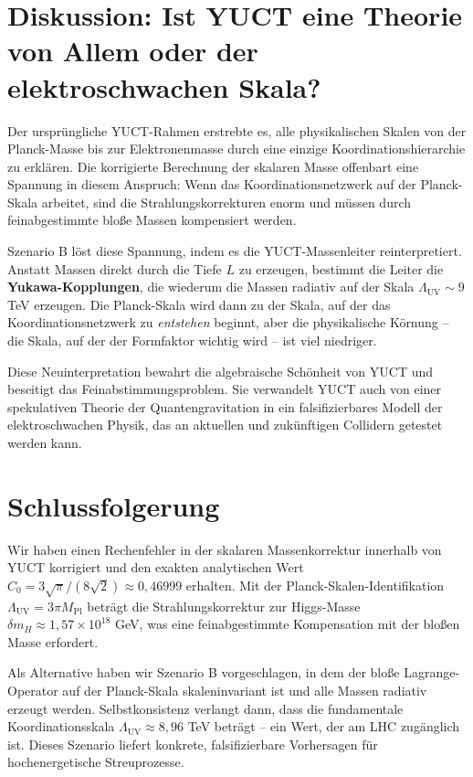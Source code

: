 \documentclass[11pt,a4paper]{article}
\newcommand{\Mpl}{M_{\mathrm{Pl}}}
\newcommand{\LUV}{\Lambda_{\mathrm{UV}}}
\theoremstyle{remark}
\begin{document}
	\section{Diskussion: Ist YUCT eine Theorie von Allem oder der elektroschwachen Skala?}
	\label{sec:discussion}
	
	Der ursprüngliche YUCT-Rahmen erstrebte es, alle physikalischen Skalen von der Planck-Masse bis zur Elektronenmasse durch eine einzige Koordinationshierarchie zu erklären. Die korrigierte Berechnung der skalaren Masse offenbart eine Spannung in diesem Anspruch: Wenn das Koordinationsnetzwerk auf der Planck-Skala arbeitet, sind die Strahlungskorrekturen enorm und müssen durch feinabgestimmte bloße Massen kompensiert werden.
	
	Szenario B löst diese Spannung, indem es die YUCT-Massenleiter reinterpretiert. Anstatt Massen direkt durch die Tiefe \(L\) zu erzeugen, bestimmt die Leiter die \textbf{Yukawa-Kopplungen}, die wiederum die Massen radiativ auf der Skala \(\LUV \sim 9\) TeV erzeugen. Die Planck-Skala wird dann zu der Skala, auf der das Koordinationsnetzwerk zu \textit{entstehen} beginnt, aber die physikalische Körnung – die Skala, auf der der Formfaktor wichtig wird – ist viel niedriger.
	
	Diese Neuinterpretation bewahrt die algebraische Schönheit von YUCT und beseitigt das Feinabstimmungsproblem. Sie verwandelt YUCT auch von einer spekulativen Theorie der Quantengravitation in ein falsifizierbares Modell der elektroschwachen Physik, das an aktuellen und zukünftigen Collidern getestet werden kann.
	
	\section{Schlussfolgerung}
	\label{sec:conclusion}
	
	Wir haben einen Rechenfehler in der skalaren Massenkorrektur innerhalb von YUCT korrigiert und den exakten analytischen Wert \(C_0 = 3\sqrt{\pi}/(8\sqrt{2}) \approx 0,46999\) erhalten. Mit der Planck-Skalen-Identifikation \(\LUV = 3\pi\Mpl\) beträgt die Strahlungskorrektur zur Higgs-Masse \(\delta m_H \approx 1,57\times 10^{18}\) GeV, was eine feinabgestimmte Kompensation mit der bloßen Masse erfordert.
	
	Als Alternative haben wir Szenario B vorgeschlagen, in dem der bloße Lagrange-Operator auf der Planck-Skala skaleninvariant ist und alle Massen radiativ erzeugt werden. Selbstkonsistenz verlangt dann, dass die fundamentale Koordinationsskala \(\LUV \approx 8,96\) TeV beträgt – ein Wert, der am LHC zugänglich ist. Dieses Szenario liefert konkrete, falsifizierbare Vorhersagen für hochenergetische Streuprozesse.
	
\end{document}
